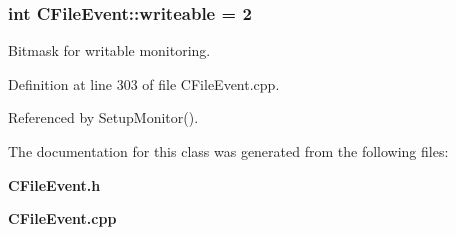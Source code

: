 \subsubsection{\setlength{\rightskip}{0pt plus 5cm}int CFile\-Event::writeable = 2\hspace{0.3cm}{\tt  [static]}}\label{classCFileEvent_p1}


Bitmask for writable monitoring.



Definition at line 303 of file CFile\-Event.cpp.

Referenced by Setup\-Monitor().

The documentation for this class was generated from the following files:\begin{CompactItemize}
\item 
{\bf CFile\-Event.h}\item 
{\bf CFile\-Event.cpp}\end{CompactItemize}
